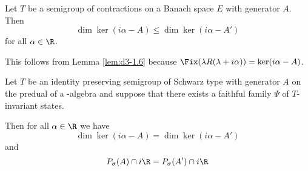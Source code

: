 \begin{corollary}\label{cor:d3-1.7}
Let $T$ be a semigroup of contractions on a Banach space $E$ with generator $A$.
Then
\[
\dim \ker(i\alpha - A) \leq \dim \ker(i\alpha - A')
\]
for all $\alpha \in \R$.
\end{corollary}

This follows from Lemma \ref{lem:d3-1.6} because $\Fix(\lambda R(\lambda+i\alpha)) = \ker(i\alpha-A)$.
\begin{proposition}\label{prop:d3-1.8}
Let $T$ be an identity preserving semigroup of Schwarz type with generator $A$ on the predual of a \WA-algebra and suppose that there exists a faithful family $\Psi$ of $T$-invariant states.

Then for all $\alpha \in \R$ we have
\[
\dim \ker(i\alpha - A) = \dim \ker(i\alpha - A')
\]
and
\[
P_{\sigma}(A) \cap i\R = P_{\sigma}(A') \cap i\R
\]
\end{proposition}

